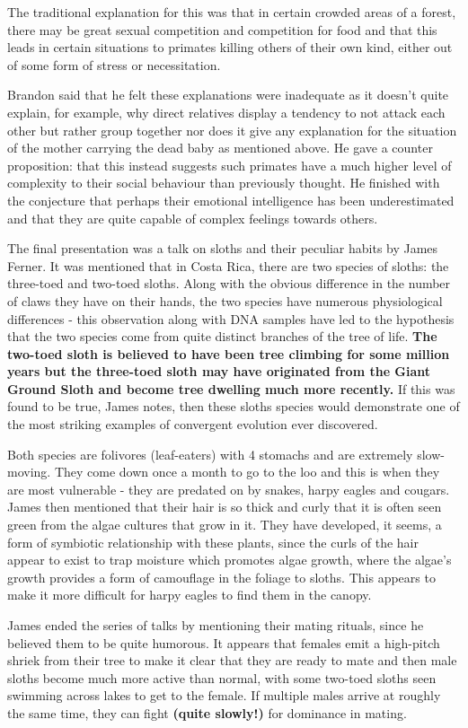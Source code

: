 	The traditional explanation for this was that in certain crowded areas
	of a forest, there may be great sexual competition and competition for
	food and that this leads in certain situations to primates killing
	others of their own kind, either out of some form of stress or
	necessitation.

	Brandon said that he felt these explanations were inadequate as it
	doesn't quite explain, for example, why direct relatives display a
	tendency to not attack each other but rather group together nor does it
	give any explanation for the situation of the mother carrying the dead
	baby as mentioned above. He gave a counter proposition: that this
	instead suggests such primates have a much higher level of complexity to
	their social behaviour than previously thought. He finished with the
	conjecture that perhaps their emotional intelligence has been
	underestimated and that they are quite capable of complex feelings
	towards others.

	The final presentation was a talk on sloths and their peculiar habits by
	James Ferner. It was mentioned that in Costa Rica, there are two species
	of sloths: the three-toed and two-toed sloths. Along with the obvious
	difference in the number of claws they have on their hands, the two
	species have numerous physiological differences - this observation along
	with DNA samples have led to the hypothesis that the two species come
	from quite distinct branches of the tree of life.
	\textbf{The two-toed sloth is believed to have been tree climbing for some million years but the three-toed sloth may have originated from the Giant Ground Sloth and become tree dwelling much more recently.}
	If this was found to be true, James notes, then these sloths species
	would demonstrate one of the most striking examples of convergent
	evolution ever discovered.

	Both species are folivores (leaf-eaters) with 4 stomachs and are
	extremely slow-moving. They come down once a month to go to the loo and
	this is when they are most vulnerable - they are predated on by snakes,
	harpy eagles and cougars. James then mentioned that their hair is so
	thick and curly that it is often seen green from the algae cultures that
	grow in it. They have developed, it seems, a form of symbiotic
	relationship with these plants, since the curls of the hair appear to
	exist to trap moisture which promotes algae growth, where the algae's
	growth provides a form of camouflage in the foliage to sloths. This
	appears to make it more difficult for harpy eagles to find them in the
	canopy.

	James ended the series of talks by mentioning their mating rituals,
	since he believed them to be quite humorous. It appears that females
	emit a high-pitch shriek from their tree to make it clear that they are
	ready to mate and then male sloths become much more active than normal,
	with some two-toed sloths seen swimming across lakes to get to the
	female. If multiple males arrive at roughly the same time, they can
	fight \textbf{(quite slowly!)} for dominance in mating.
